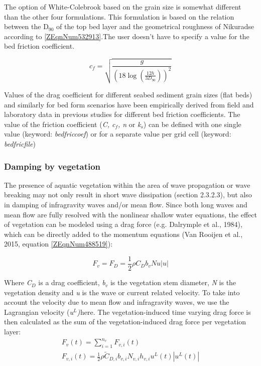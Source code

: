 \documentclass{article}
\begin{document}
\noindent The option of White-Colebrook based on the grain size is somewhat different than the other four formulations. This formulation is based on the relation between the D${}_{90}$ of the top bed layer and the geometrical roughness of Nikuradse according to \eqref{ZEqnNum532913}.The user doesn't have to specify a value for the bed friction coefficient.

\noindent 
\begin{equation} \label{ZEqnNum532913} 
c_{f} =\sqrt{\frac{g}{\left(18\log \left(\frac{12h}{3D_{90} } \right)\right)^{2} } }  
\end{equation} 


\noindent Values of the drag coefficient for different seabed sediment grain sizes (flat beds) and similarly for bed form scenarios have been empirically derived from field and laboratory data in previous studies for different bed friction coefficients. The value of the friction coefficient (\textit{C, c${}_{f}$, n} or \textit{k${}_{s}$}) can be defined with one single value (keyword: \textit{bedfriccoef}) or for a separate value per grid cell (keyword: \textit{bedfricfile})


\subsubsection{ Damping by vegetation}

\noindent The presence of aquatic vegetation within the area of wave propagation or wave breaking may not only result in short wave dissipation (section 2.3.2.3), but also in damping of infragravity waves and/or mean flow. Since both long waves and mean flow are fully resolved with the nonlinear shallow water equations, the effect of vegetation can be modeled using a drag force (e.g. Dalrymple et al., 1984), which can be directly added to the momentum equations (Van Rooijen et al., 2015, equation \eqref{ZEqnNum488519}):

\noindent 
\begin{equation} \label{2.57)} 
F_{v} =F_{D} =\frac{1}{2} \rho C_{D} b_{v} Nu\left|u\right| 
\end{equation} 


\noindent Where \textit{C${}_{D}$} is a drag coefficient, \textit{b${}_{v}$} is the vegetation stem diameter, \textit{N} is the vegetation density and \textit{u} is the wave or current related velocity. To take into account the velocity due to mean flow and infragravity waves, we use the Lagrangian velocity (\textit{u${}^{L}$)}${}^{ }$here. The vegetation-induced time varying drag force is then calculated as the sum of the vegetation-induced drag force per vegetation layer:
\begin{equation} \label{2.58)} 
\begin{array}{l} {F_{v} (t)=\sum _{i=1}^{n_{v} }F_{v,i}  (t)} \\ {F_{v,i} (t)=\frac{1}{2} \rho \widetilde{C}_{D,i} b_{v,i} N_{v,i} h_{v,i} u^{L} (t)\left|u^{L} (t)\right|} \end{array} 
\end{equation} 
\end{document}

